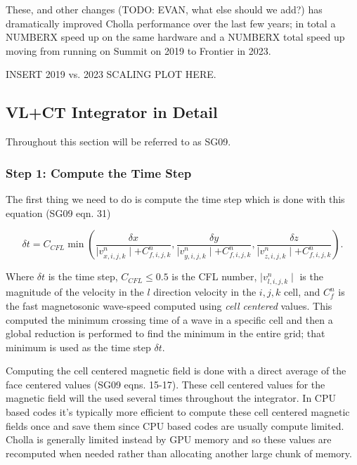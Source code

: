 These, and other changes (TODO: EVAN, what else should we add?) has dramatically improved Cholla performance over the last few years; in total a NUMBERX speed up on the same hardware and a NUMBERX total speed up moving from running on Summit on 2019 to Frontier in 2023.

INSERT 2019 vs. 2023 SCALING PLOT HERE.

\subsection{VL+CT Integrator in Detail}
\label{vlct:header}

Throughout this section \cite{stone_2009} will be referred to as SG09.

\subsubsection{Step 1: Compute the Time Step}
\label{vlct:dt}

The first thing we need to do is compute the time step which is done with this equation (SG09 eqn. 31)

\begin{equation}
    \delta t = C_{CFL} \min \left(
        \frac{\delta x}{\mid v^n_{x,i,j,k} \mid + C^n_{f,i,j,k}},
        \frac{\delta y}{\mid v^n_{y,i,j,k} \mid + C^n_{f,i,j,k}},
        \frac{\delta z}{\mid v^n_{z,i,j,k} \mid + C^n_{f,i,j,k}}
    \right).
\end{equation}

Where $\delta t$ is the time step, $C_{CFL} \leq 0.5$ is the CFL number, $\mid v^n_{l,i,j,k}\mid $ is the magnitude of the velocity in the $l$ direction velocity in the ${i,j,k}$ cell, and $C^n_f $ is the fast magnetosonic wave-speed computed using \emph{cell centered} values. This computed the minimum crossing time of a wave in a specific cell and then a global reduction is performed to find the minimum in the entire grid; that minimum is used as the time step $\delta t$.

Computing the cell centered magnetic field is done with a direct average of the face centered values (SG09 eqns. 15-17). These cell centered values for the magnetic field will the used several times throughout the integrator. In CPU based codes it's typically more efficient to compute these cell centered magnetic fields once and save them since CPU based codes are usually compute limited. Cholla is generally limited instead by GPU memory and so these values are recomputed when needed rather than allocating another large chunk of memory.

